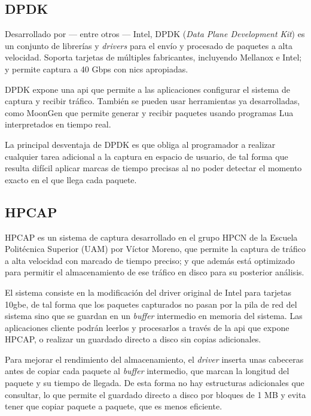 \documentclass[twoside, 12pt, draft]{epstfg}
\begin{document}
\subsection{DPDK}

Desarrollado por --- entre otros --- Intel, DPDK (\textit{Data Plane Development Kit}) \cite{IntelDPDK} es un conjunto de librerías y \textit{drivers} para el envío y procesado de paquetes a alta velocidad. Soporta tarjetas de múltiples fabricantes, incluyendo Mellanox e Intel; y permite captura a 40 Gbps con \glspl{nic} apropiadas.

DPDK expone una \gls{api} que permite a las aplicaciones configurar el sistema de captura y recibir tráfico. También se pueden usar herramientas ya desarrolladas, como MoonGen \cite{emmerich2015moongen} que permite generar y recibir paquetes usando programas Lua interpretados en tiempo real.

La principal desventaja de DPDK es que obliga al programador a realizar cualquier tarea adicional a la captura en espacio de usuario, de tal forma que resulta difícil aplicar marcas de tiempo precisas al no poder detectar el momento exacto en el que llega cada paquete.

\subsection{HPCAP}
\label{sec:EstadoArte:HPCAP}

HPCAP \cite{victorPhD} es un sistema de captura desarrollado en el grupo HPCN de la Escuela Politécnica Superior (UAM) por Víctor Moreno, que permite la captura de tráfico a alta velocidad con marcado de tiempo preciso; y que además está optimizado para permitir el almacenamiento de ese tráfico en disco para su posterior análisis.

El sistema consiste en la modificación del \gls{driver} original de Intel para tarjetas \gls{10gbe}, de tal forma que los paquetes capturados no pasan por la pila de red del sistema sino que se guardan en un \textit{buffer} intermedio en memoria del sistema. Las aplicaciones cliente podrán leerlos y procesarlos a través de la \gls{api} que expone HPCAP, o realizar un guardado directo a disco sin copias adicionales.

Para mejorar el rendimiento del almacenamiento, el \textit{driver} inserta unas cabeceras antes de copiar cada paquete al \textit{buffer} intermedio, que marcan la longitud del paquete y su tiempo de llegada. De esta forma no hay estructuras adicionales que consultar, lo que permite el guardado directo a disco por bloques de 1 MB y evita tener que copiar paquete a paquete, que es menos eficiente.
\end{document}
